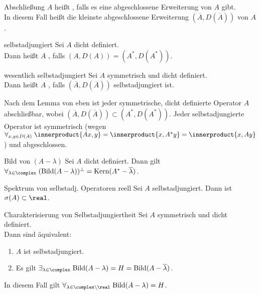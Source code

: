 \begin{Def}{Abschließung}
    $A$ heißt , falls es eine abgeschlossene Erweiterung von $A$ gibt.\\
    In diesem Fall heißt die kleinste abgeschlossene Erweiterung $(\overline{A}, D(\overline{A}))$
     von $A$.
\end{Def}

\begin{Def}{selbstadjungiert}
    Sei $A$ dicht definiert.\\
    Dann heißt $A$ , falls $(A, D(A)) = (A^\ast, D(A^\ast))$.
\end{Def}

\begin{Def}{wesentlich selbstadjungiert}
    Sei $A$ symmetrisch und dicht definiert.\\
    Dann heißt $A$ , falls
    $(\overline{A}, D(\overline{A}))$ selbstadjungiert ist.
\end{Def}

\begin{Bem}
    Nach dem Lemma von eben ist jeder symmetrische, dicht definierte Operator $A$ abschließbar,
    wobei $(\overline{A}, D(\overline{A})) \subset (A^\ast, D(A^\ast))$.
    Jeder selbstadjungierte Operator ist symmetrisch
    (wegen $\forall_{x, y \in D(A)}\; \innerproduct{Ax, y} = \innerproduct{x, A^\ast y} = \innerproduct{x, Ay}$)
    und abgeschlossen.
\end{Bem}

\linie

\begin{Lemma}{Bild von $(A - \lambda)$}
    Sei $A$ dicht definiert.
    Dann gilt $\forall_{\lambda \in \complex}\;
    (\Bild(A - \lambda))^{\orth} = \Kern(A^\ast - \overline{\lambda})$.
\end{Lemma}

\begin{Satz}{Spektrum von selbstadj. Operatoren reell}
    Sei $A$ selbstadjungiert.
    Dann ist $\sigma(A) \subset \real$.
\end{Satz}

\begin{Satz}{Charakterisierung von Selbstadjungiertheit}
    Sei $A$ symmetrisch und dicht definiert.\\
    Dann sind äquivalent:
    \begin{enumerate}
        \item
        $A$ ist selbstadjungiert.

        \item
        Es gilt
        $\exists_{\lambda \in \complex}\; \Bild(A - \lambda) = H = \Bild(A - \overline{\lambda})$.
    \end{enumerate}
    In diesem Fall gilt $\forall_{\lambda \in \complex \setminus \real}\; \Bild(A - \lambda) = H$.
\end{Satz}

